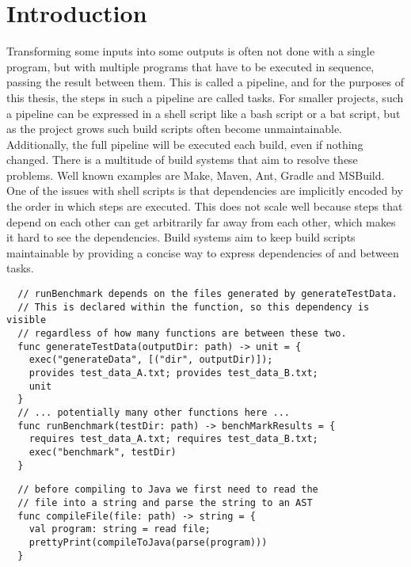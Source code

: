 
\section{Introduction}
\label{sec:introduction}

Transforming some inputs into some outputs is often not done with a single program, but with multiple programs that have to be executed in sequence, passing the result between them.
This is called a pipeline, and for the purposes of this thesis, the steps in such a pipeline are called tasks.
For smaller projects, such a pipeline can be expressed in a shell script like a bash script or a bat script, but as the project grows such build scripts often become unmaintainable.\autocites{Hatch2018}{Moodie2006}
Additionally, the full pipeline will be executed each build, even if nothing changed.
There is a multitude of build systems that aim to resolve these problems.
Well known examples are Make, Maven, Ant, Gradle and MSBuild.\missingref
One of the issues with shell scripts is that dependencies are implicitly encoded by the order in which steps are executed.
This does not scale well because steps that depend on each other can get arbitrarily far away from each other, which makes it hard to see the dependencies.
Build systems aim to keep build scripts maintainable by providing a concise way to express dependencies of and between tasks.
\begin{lstlisting}
  // runBenchmark depends on the files generated by generateTestData.
  // This is declared within the function, so this dependency is visible
  // regardless of how many functions are between these two.
  func generateTestData(outputDir: path) -> unit = {
    exec("generateData", [("dir", outputDir)]);
    provides test_data_A.txt; provides test_data_B.txt;
    unit
  }
  // ... potentially many other functions here ...
  func runBenchmark(testDir: path) -> benchMarkResults = {
    requires test_data_A.txt; requires test_data_B.txt;
    exec("benchmark", testDir)
  }
\end{lstlisting}
\begin{lstlisting}
  // before compiling to Java we first need to read the
  // file into a string and parse the string to an AST
  func compileFile(file: path) -> string = {
    val program: string = read file;
    prettyPrint(compileToJava(parse(program)))
  }
\end{lstlisting}
